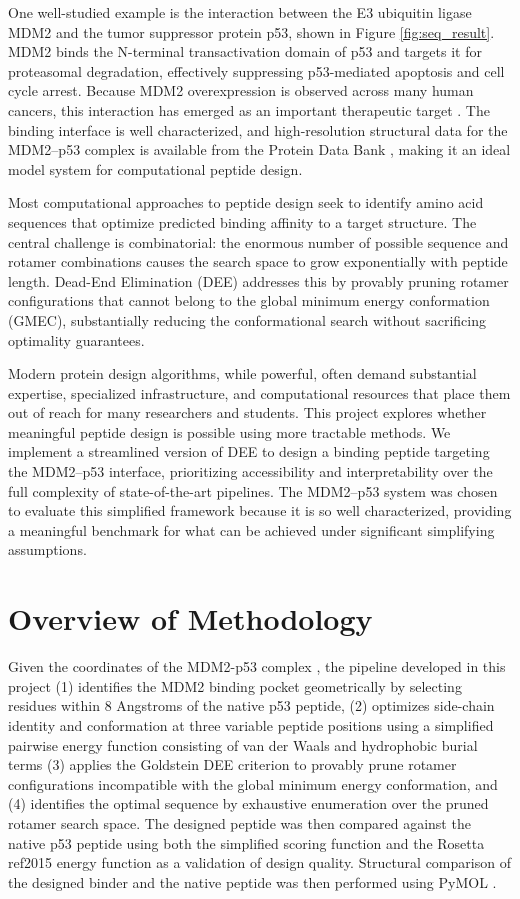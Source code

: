 One well-studied example is the interaction between the E3 ubiquitin ligase MDM2 and the tumor suppressor protein p53, shown in Figure \ref{fig:seq_result}. MDM2 binds the N-terminal transactivation domain of p53 and targets it for proteasomal degradation, effectively suppressing p53-mediated apoptosis and cell cycle arrest. Because MDM2 overexpression is observed across many human cancers, this interaction has emerged as an important therapeutic target \cite{NCBI}. The binding interface is well characterized, and high-resolution structural data for the MDM2–p53 complex is available from the Protein Data Bank \cite{PDB}, making it an ideal model system for computational peptide design.

Most computational approaches to peptide design seek to identify amino acid sequences that optimize predicted binding affinity to a target structure. The central challenge is combinatorial: the enormous number of possible sequence and rotamer combinations causes the search space to grow exponentially with peptide length. Dead-End Elimination (DEE) addresses this by provably pruning rotamer configurations that cannot belong to the global minimum energy conformation (GMEC), substantially reducing the conformational search without sacrificing optimality guarantees.

Modern protein design algorithms, while powerful, often demand substantial expertise, specialized infrastructure, and computational resources that place them out of reach for many researchers and students. This project explores whether meaningful peptide design is possible using more tractable methods. We implement a streamlined version of DEE to design a binding peptide targeting the MDM2–p53 interface, prioritizing accessibility and interpretability over the full complexity of state-of-the-art pipelines. The MDM2–p53 system was chosen to evaluate this simplified framework because it is so well characterized, providing a meaningful benchmark for what can be achieved under significant simplifying assumptions.

\section{Overview of Methodology}
Given the coordinates of the MDM2-p53 complex \cite{PDB}, the pipeline developed in this project (1) identifies the MDM2 binding pocket geometrically by selecting residues within 8 Angstroms of the native p53 peptide, (2) optimizes side-chain identity and conformation at three variable peptide positions using a simplified pairwise energy function consisting of van der Waals and hydrophobic burial terms (3) applies the Goldstein DEE criterion \cite{Dahiyat} to provably prune rotamer configurations incompatible with the global minimum energy conformation, and (4) identifies the optimal sequence by exhaustive enumeration over the pruned rotamer search space. The designed peptide was then compared against the native p53 peptide using both the simplified scoring function and the Rosetta ref2015 energy function \cite{RosettaScoring} as a validation of design quality. Structural comparison of the designed binder and the native peptide was then performed using PyMOL \cite{PyMOL}.

